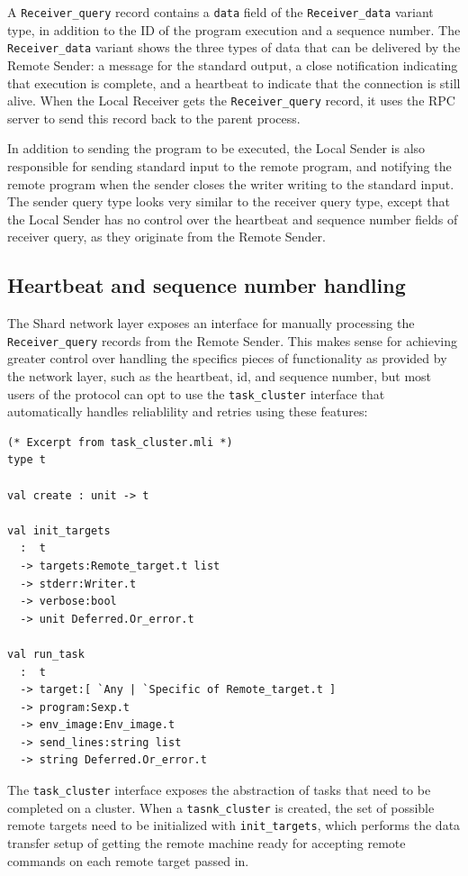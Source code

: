 \documentclass[twoside]{report}
\begin{document}
A \texttt{Receiver\_query} record contains a \texttt{data} field of the \texttt{Receiver\_data} variant type, in addition to the ID of the program execution and a sequence number.
The \texttt{Receiver\_data} variant shows the three types of data that can be delivered by the Remote Sender: a message for the standard output, a close notification indicating that execution is complete, and a heartbeat to indicate that the connection is still alive.
When the Local Receiver gets the \texttt{Receiver\_query} record, it uses the RPC server to send this record back to the parent process.

In addition to sending the program to be executed, the Local Sender is also responsible for sending standard input to the remote program, and notifying the remote program when the sender closes the writer writing to the standard input.
The sender query type looks very similar to the receiver query type, except that the Local Sender has no control over the heartbeat and sequence number fields of receiver query, as they originate from the Remote Sender.

\subsection{Heartbeat and sequence number handling}
The Shard network layer exposes an interface for manually processing the \texttt{Receiver\_query} records from the Remote Sender.
This makes sense for achieving greater control over handling the specifics pieces of functionality as provided by the network layer, such as the heartbeat, id, and sequence number, but most users of the protocol can opt to use the \texttt{task\_cluster} interface that automatically handles reliablility and retries using these features:

\begin{lstlisting}
(* Excerpt from task_cluster.mli *)
type t

val create : unit -> t

val init_targets
  :  t
  -> targets:Remote_target.t list
  -> stderr:Writer.t
  -> verbose:bool
  -> unit Deferred.Or_error.t

val run_task
  :  t
  -> target:[ `Any | `Specific of Remote_target.t ]
  -> program:Sexp.t
  -> env_image:Env_image.t
  -> send_lines:string list
  -> string Deferred.Or_error.t
\end{lstlisting}

The \texttt{task\_cluster} interface exposes the abstraction of tasks that need to be completed on a cluster.
When a \texttt{tasnk\_cluster} is created, the set of possible remote targets need to be initialized with \texttt{init\_targets}, which performs the data transfer setup of getting the remote machine ready for accepting remote commands on each remote target passed in.
\end{document}
